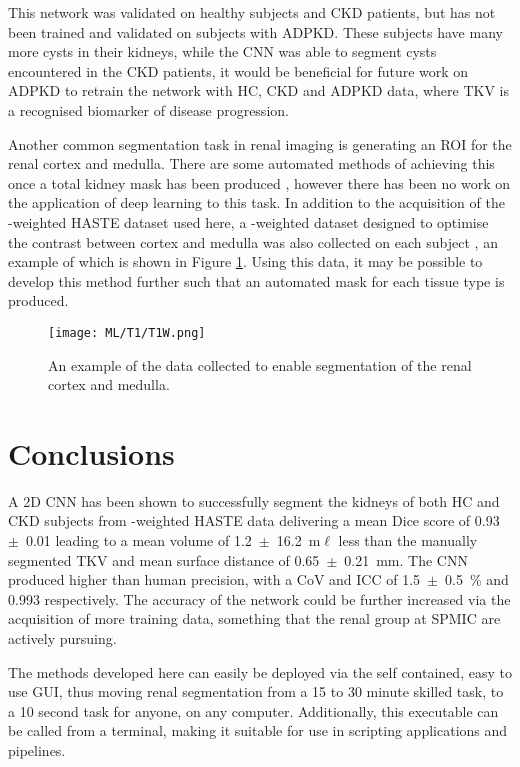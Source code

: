 This network was validated on healthy subjects and \ac{CKD} patients, but has not been trained and validated on subjects with \ac{ADPKD}. These subjects have many more cysts in their kidneys, while the \ac{CNN} was able to segment cysts encountered in the \ac{CKD} patients, it would be beneficial for future work on \ac{ADPKD} to retrain the network with \ac{HC}, \ac{CKD} and \ac{ADPKD} data, where \ac{TKV} is a recognised biomarker of disease progression.

Another common segmentation task in renal imaging is generating an \ac{ROI} for the renal cortex and medulla. There are some automated methods of achieving this once a total kidney mask has been produced \cite{cox_multiparametric_2017, morris_segmentation_2019}, however there has been no work on the application of deep learning to this task. In addition to the acquisition of the \ttwo-weighted \ac{HASTE} dataset used here, a \tone-weighted dataset designed to optimise the contrast between cortex and medulla was also collected on each subject \cite{will_automated_2014}, an example of which is shown in Figure \ref{fig:ml_t1}. Using this data, it may be possible to develop this method further such that an automated mask for each tissue type is produced. 

\begin{figure}[H]
	\centering
	\texttt{[image: ML/T1/T1W.png]}
	\caption{An example of the data collected to enable segmentation of the renal cortex and medulla.}
	\label{fig:ml_t1}
\end{figure}

\newpage

\section{Conclusions}

A 2D \ac{CNN} has been shown to successfully segment the kidneys of both \ac{HC} and \ac{CKD} subjects from \ttwo-weighted \ac{HASTE} data delivering a mean Dice score of 0.93~$\pm$~0.01 leading to a mean volume of 1.2~$\pm$~16.2~m$\ell$ less than the manually segmented \ac{TKV} and mean surface distance of 0.65~$\pm$~0.21~mm. The \ac{CNN} produced higher than human precision, with a \ac{CoV} and \ac{ICC} of 1.5~$\pm$~0.5~\% and 0.993 respectively. The accuracy of the network could be further increased via the acquisition of more training data, something that the renal group at \ac{SPMIC} are actively pursuing. 

The methods developed here can easily be deployed via the self contained, easy to use \ac{GUI}, thus moving renal segmentation from a 15 to 30 minute skilled task, to a 10 second task for anyone, on any computer. Additionally, this executable can be called from a terminal, making it suitable for use in scripting applications and pipelines.

